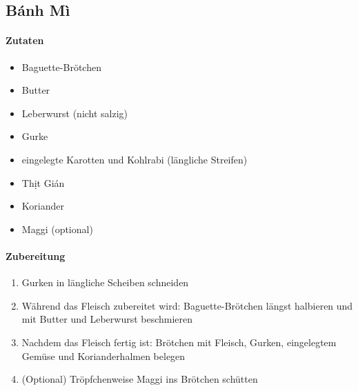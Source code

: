 \newpage
{}
\subsection{Bánh Mì}
\paragraph{Zutaten}
\begin{itemize}[noitemsep]
	\item Baguette-Brötchen 
	\item Butter
	\item Leberwurst (nicht salzig)
	\item Gurke
	\item eingelegte Karotten und Kohlrabi (längliche Streifen)
	\item Thịt Gián 
	\item Koriander
	\item Maggi (optional)
\end{itemize}
\paragraph{Zubereitung}
\begin{enumerate}[noitemsep]
	\item Gurken in längliche Scheiben schneiden
	\item Während das Fleisch zubereitet wird: Baguette-Brötchen längst halbieren und mit Butter und Leberwurst beschmieren
	\item Nachdem das Fleisch fertig ist: Brötchen mit Fleisch, Gurken, eingelegtem Gemüse und Korianderhalmen belegen
	\item (Optional) Tröpfchenweise Maggi ins Brötchen schütten
\end{enumerate}
